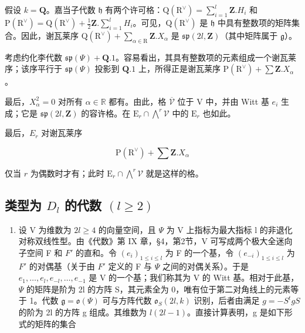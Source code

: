 假设 \(k = \mathbf{Q}\)。嘉当子代数 \(\mathfrak{h}\) 有两个许可格：\(\mathrm{Q}(\mathrm{R}^{\vee}) = \sum_{i=1}^{l} \mathbf{Z}.H_i\) 和 \(\mathrm{P}(\mathrm{R}^{\vee}) = \mathrm{Q}(\mathrm{R}^{\vee}) + \frac{1}{2}\mathbf{Z}. \sum_{i=1}^{l} H_i\)。可见，\(\mathrm{Q}(\mathrm{R}^{\vee})\) 是 \(\mathfrak{h}\) 中具有整数项的矩阵集合。因此，谢瓦莱序 \(\mathrm{Q}(\mathrm{R}^{\vee}) + \sum_{\alpha \in \mathrm{R}} \mathbf{Z}.X_{\alpha}\) 是 \(\mathfrak{sp}(2l,\mathbf{Z})\)（其中矩阵属于 \(\mathfrak{g}\)）。

考虑约化李代数 \(\mathfrak{sp}(\varPsi) + \mathbf{Q}.1\)。容易看出，其具有整数项的元素组成一个谢瓦莱序；该序平行于 \(\mathfrak{sp}(\varPsi)\) 投影到 \(\mathbf{Q}.1\) 上，所得正是谢瓦莱序 \(\mathrm{P}(\mathrm{R}^{\vee}) + \sum \mathbf{Z}.X_{\alpha}\)。

最后，\(X_{\alpha}^{2} = 0\) 对所有 \(\alpha \in \mathbb{R}\) 都有。由此，格 \(\overline{\mathcal{V}}\) 位于 \(\mathrm{V}\) 中，并由 Witt 基 \(e_i\) 生成；它是 \(\mathfrak{sp}(2l,\mathbf{Z})\) 的容许格。在 \(\mathrm{E}_r \cap \bigwedge^r \mathcal{V}\) 中的 \(\mathrm{E}_r\) 也如此。

最后，\(E_{r}\) 对谢瓦莱序

\[
\mathrm{P} (\mathrm{R} ^ {\vee}) + \sum \mathbf {Z}. X _ {\alpha}
\]

仅当 \(r\) 为偶数时才有；此时 \(\mathrm{E}_r\cap \bigwedge^r\mathcal{V}\) 就是这样的格。

\subsection{\texorpdfstring{类型为 \(D_{l}\) 的代数 \((l\geq 2)\)}{类型为 D\_\{l\} 的代数 (l\textbackslash geq 2)}}

\begin{enumerate}
\def\labelenumi{(\Roman{enumi})}
\tightlist
\item
  设 V 为维数为 \(2l \geq 4\) 的向量空间，且 \(\varPsi\) 为 V 上指标为最大指标 l 的非退化对称双线性型。由《代数》第 IX 章，§4，第2节，V 可写成两个极大全迷向子空间 F 和 \(F'\) 的直和。令 \((e_i)_{1 \leq i \leq l}\) 为 F 的一个基，令 \((e_{-i})_{1 \leq i \leq l}\) 为 \(F'\) 的对偶基（关于由 \(F'\) 定义的 F 与 \(\varPsi\) 之间的对偶关系）。于是 \(e_1, \ldots, e_l, e_{-l}, \ldots, e_{-1}\) 是 V 的一个基；我们称其为 V 的 Witt 基。相对于此基，\(\varPsi\) 的矩阵是阶为 2l 的方阵 S，其元素全为 0，唯有位于第二对角线上的元素等于 1。代数 \(\mathfrak{g} = \mathfrak{o}(\varPsi)\) 可与方阵代数 \(\mathfrak{o}_S(2l, k)\) 识别，后者由满足 \(g = -S^t g S\) 的阶为 2l 的方阵 g 组成。其维数为 \(l(2l - 1)\)。直接计算表明，g 是如下形式的矩阵的集合
\end{enumerate}

